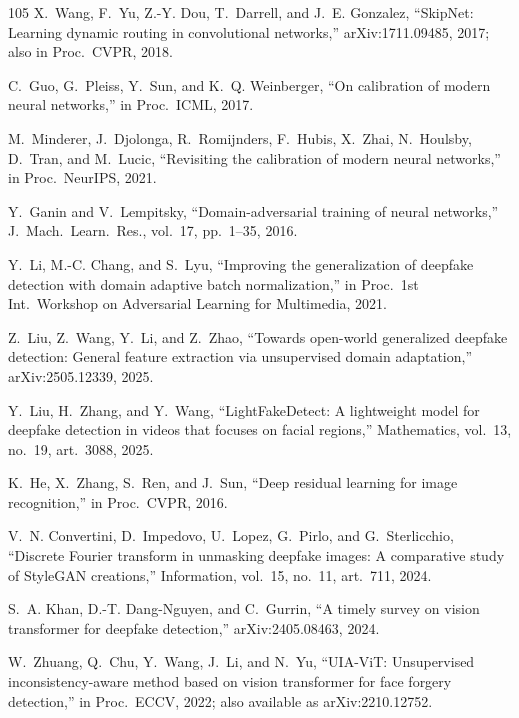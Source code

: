 \begin{thebibliography}{105}
X.~Wang, F.~Yu, Z.-Y. Dou, T.~Darrell, and J.~E. Gonzalez, ``SkipNet: Learning dynamic routing in convolutional networks,'' arXiv:1711.09485, 2017; also in Proc.\ CVPR, 2018.

C.~Guo, G.~Pleiss, Y.~Sun, and K.~Q. Weinberger, ``On calibration of modern neural networks,'' in Proc.\ ICML, 2017.

M.~Minderer, J.~Djolonga, R.~Romijnders, F.~Hubis, X.~Zhai, N.~Houlsby, D.~Tran, and M.~Lucic, ``Revisiting the calibration of modern neural networks,'' in Proc.\ NeurIPS, 2021.

Y.~Ganin and V.~Lempitsky, ``Domain-adversarial training of neural networks,'' J.\ Mach.\ Learn.\ Res., vol.~17, pp.~1--35, 2016.

Y.~Li, M.-C. Chang, and S.~Lyu, ``Improving the generalization of deepfake detection with domain adaptive batch normalization,'' in Proc.\ 1st Int.\ Workshop on Adversarial Learning for Multimedia, 2021.

Z.~Liu, Z.~Wang, Y.~Li, and Z.~Zhao, ``Towards open-world generalized deepfake detection: General feature extraction via unsupervised domain adaptation,'' arXiv:2505.12339, 2025.

Y.~Liu, H.~Zhang, and Y.~Wang, ``LightFakeDetect: A lightweight model for deepfake detection in videos that focuses on facial regions,'' Mathematics, vol.~13, no.~19, art.~3088, 2025.

K.~He, X.~Zhang, S.~Ren, and J.~Sun, ``Deep residual learning for image recognition,'' in Proc.\ CVPR, 2016.

V.~N. Convertini, D.~Impedovo, U.~Lopez, G.~Pirlo, and G.~Sterlicchio, ``Discrete Fourier transform in unmasking deepfake images: A comparative study of StyleGAN creations,'' Information, vol.~15, no.~11, art.~711, 2024.

S.~A. Khan, D.-T. Dang-Nguyen, and C.~Gurrin, ``A timely survey on vision transformer for deepfake detection,'' arXiv:2405.08463, 2024.

W.~Zhuang, Q.~Chu, Y.~Wang, J.~Li, and N.~Yu, ``UIA-ViT: Unsupervised inconsistency-aware method based on vision transformer for face forgery detection,'' in Proc.\ ECCV, 2022; also available as arXiv:2210.12752.


\end{thebibliography}

